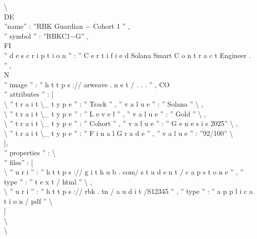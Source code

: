 \documentclass[12pt,landscape,a4paper]{article}
\begin{document}
\textbackslash{}{\\
\vspace{0.5em}
\vspace{0.5em}
\vspace{0.5em}
\vspace{0.5em}
DE\\
”name” : ”RBK Guardian − Cohort 1 ” ,\\
” symbol ” : ”RBKC1−G” ,\\
\vspace{0.5em}
\vspace{0.5em}
\vspace{0.5em}
\vspace{0.5em}
FI\\
” d e s c r i p t i o n ” : ” C e r t i f i e d Solana Smart C o n t r a c t Engineer . ” ,\\
\vspace{0.5em}
\vspace{0.5em}
\vspace{0.5em}
N\\
” image ” : ” h t t p s :// arweave . n e t / . . . ” ,           CO\\
” attributes ” : [\\
\textbackslash{}{ ” t r a i t \textbackslash{}_ t y p e ” : ” Track ” , ” v a l u e ” : ” Solana ” \textbackslash{}} ,\\
\textbackslash{}{ ” t r a i t \textbackslash{}_ t y p e ” : ” L e v e l ” , ” v a l u e ” : ” Gold ” \textbackslash{}} ,\\
\textbackslash{}{ ” t r a i t \textbackslash{}_ t y p e ” : ” Cohort ” , ” v a l u e ” : ” G e n e s i s 2025” \textbackslash{}} ,\\
\textbackslash{}{ ” t r a i t \textbackslash{}_ t y p e ” : ” F i n a l G r a d e ” , ” v a l u e ” : ”92/100” \textbackslash{}}\\
],\\
” properties ” : \textbackslash{}{\\
” files” : [\\
\textbackslash{}{ ” u r i ” : ” h t t p s :// g i t h u b . com/ s t u d e n t / c a p s t o n e ” , ” type ” : ” t e x t / html ” \textbackslash{}} ,\\
\textbackslash{}{ ” u r i ” : ” h t t p s :// rbk . tn / a u d i t /S12345 ” , ” type ” : ” a p p l i c a t i o n / pdf ” \textbackslash{}}\\
]\\
\textbackslash{}}\\
\textbackslash{}}\\
\end{document}
